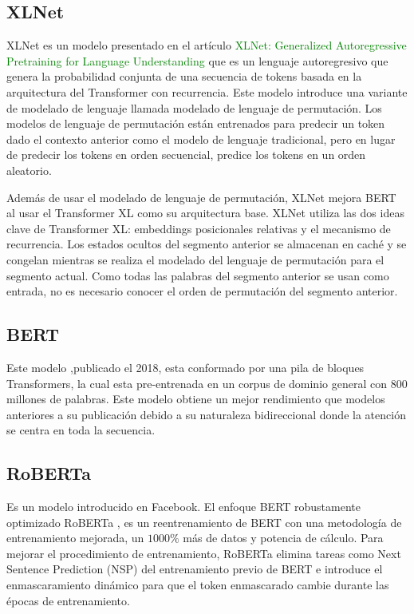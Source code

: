 \documentclass[conference]{IEEEtran}
\begin{document}
\subsection{XLNet}

XLNet es un modelo presentado en el art\'iculo \textcolor{green}{XLNet: Generalized Autoregressive Pretraining for Language Understanding} \cite{b8} que es un lenguaje autoregresivo que genera la probabilidad conjunta de una secuencia de tokens basada en la arquitectura del Transformer con recurrencia. Este modelo introduce una variante de modelado de lenguaje llamada modelado de lenguaje de permutaci\'on. Los modelos de lenguaje de permutaci\'on est\'an entrenados para predecir un token dado el contexto anterior como el modelo de lenguaje tradicional, pero en lugar de predecir los tokens en orden secuencial, predice los tokens en un orden aleatorio.

\vspace{0.2cm}

Adem\'as de usar el modelado de lenguaje de permutaci\'on, XLNet mejora BERT  al usar el Transformer XL como su arquitectura base. XLNet utiliza las dos ideas clave de Transformer XL: embeddings posicionales relativas y el mecanismo de recurrencia. Los estados ocultos del segmento anterior se almacenan en cach\'e y se congelan mientras se realiza el modelado del lenguaje de permutaci\'on para el segmento actual. Como todas las palabras del segmento anterior se usan como entrada, no es necesario conocer el orden de permutaci\'on del segmento anterior.
	
\subsection{BERT}

Este modelo \cite{b9},publicado el 2018, esta conformado por una pila de bloques Transformers, la cual esta pre-entrenada en un corpus de dominio general con 800 millones de palabras. 
Este modelo obtiene un mejor rendimiento que modelos anteriores a su publicación debido a su naturaleza bidireccional donde la atención se centra en toda la secuencia. 

\subsection{RoBERTa}

Es un modelo introducido en Facebook. El enfoque BERT robustamente optimizado RoBERTa \cite{b10}, es un reentrenamiento de BERT con una metodolog\'ia de entrenamiento mejorada, un $1000\%$ más de datos y potencia de cálculo. Para mejorar el procedimiento de entrenamiento, RoBERTa elimina tareas como Next Sentence Prediction (NSP) del entrenamiento previo de BERT e introduce el enmascaramiento dinámico para que el token enmascarado cambie durante las \'epocas de entrenamiento. 
\end{document}
